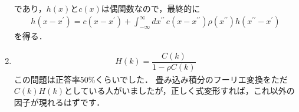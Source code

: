 \documentclass[11pt,a4]{jsarticle}
\numberwithin{equation}{section}
\begin{document}
\begin{enumerate}[(1)]
\begin{align*}
\end{align*}
であり，$h(x)$と$c(x)$は偶関数なので，最終的に
\begin{align*}
  h(x-x^{\prime}) = c(x-x^{\prime}) + \int_{-\infty}^{\infty}dx^{\prime\prime}\,c(x-x^{\prime\prime})\rho(x^{\prime\prime})h(x^{\prime\prime}-x^{\prime}) 
\end{align*}
を得る．
%
  \item
%
    \begin{align*}
      H\left(k\right) = \dfrac{C\left(k\right)}{1-\rho C\left(k\right)} 
    \end{align*}
    この問題は正答率50\%くらいでした．
    畳み込み積分のフーリエ変換をただ$C(k)H(k)$としている人がいましたが，正しく式変形すれば，これ以外の因子が現れるはずです．
\end{enumerate}
\end{document}

